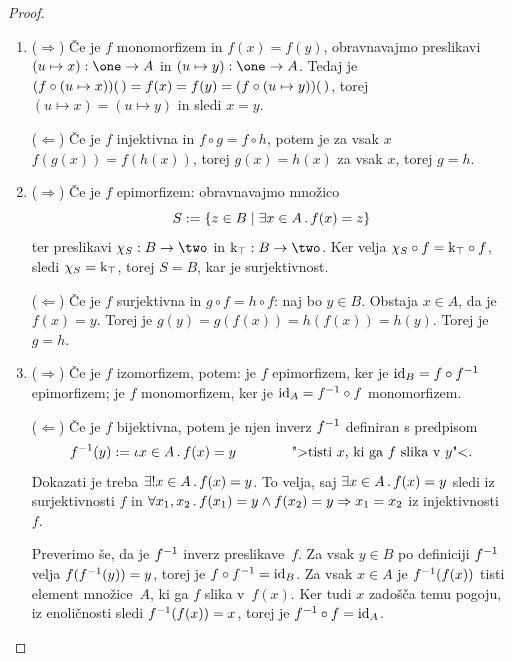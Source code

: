 \begin{proof}
  \begin{enumerate}
  \item ($\Rightarrow$) Če je $f$ monomorfizem in $f(x) = f(y)$, obravnavajmo preslikavi
  $(u \mapsto x) : \one \to A$ in $(u \mapsto y) : \one \to A$. Tedaj je
  $(f \circ (u \mapsto x)) \unit = f(x) = f(y) = (f \circ (u \mapsto y)) \unit$, torej
  $(u \mapsto x) = (u \mapsto y)$ in sledi $x = y$.

  ($\Leftarrow$) Če je $f$ injektivna in $f \circ g = f \circ h$, potem je za vsak $x$
  $f(g(x)) = f(h(x))$, torej $g(x) = h(x)$ za vsak $x$, torej $g = h$.

  \item
    ($\Rightarrow$) Če je $f$ epimorfizem: obravnavajmo množico
    \begin{equation*}
      S \defeq \set{ z \in B \such \some{x \in A} f(x) = z }
    \end{equation*}
    ter preslikavi $\chi_S : B \to \two$ in $\konst{\top} : B \to \two$. Ker velja
    $\chi_S \circ f = \konst{\top} \circ f$, sledi $\chi_S = \konst{\top}$, torej $S = B$, kar je surjektivnost.

    ($\Leftarrow$) Če je $f$ surjektivna in $g \circ f = h \circ f$: naj bo $y \in B$. Obstaja $x \in A$, da je $f(x) = y$. Torej je $g(y) = g(f(x)) = h(f(x)) = h(y)$.
    Torej je $g = h$.

  \item ($\Rightarrow$) Če je $f$ izomorfizem, potem:
    je $f$ epimorfizem, ker je $\id[B] = f \circ \inv{f}$ epimorfizem;
    je $f$ monomorfizem, ker je $\id[A] = \inv{f} \circ f$ monomorfizem.

    ($\Leftarrow$) Če je $f$ bijektivna, potem je njen inverz $\inv{f}$ definiran s predpisom
    \begin{equation*}
      \inv{f}(y) \defeq \descr{x \in A} f(x) = y \qquad\qquad
      \text{">tisti $x$, ki ga $f$ slika v $y$"<}.
    \end{equation*}
    Dokazati je treba $\exactlyone{x \in A} f(x) = y$.
    To velja, saj $\some{x \in A} f(x) = y$ sledi iz surjektivnosti $f$ in
    $\all{x_1, x_2} f(x_1) = y \land f(x_2) = y \lthen x_1 = x_2$ iz injektivnosti~$f$.

    Preverimo še, da je $\inv{f}$ inverz preslikave~$f$.
    Za vsak $y \in B$ po definiciji $\inv{f}$ velja $f(\inv{f}(y)) = y$, torej je $f \circ \inv{f} = \id[B]$.
    Za vsak $x \in A$ je $\inv{f}(f(x))$ tisti element množice~$A$, ki ga $f$ slika v~$f(x)$.
    Ker tudi $x$ zadošča temu pogoju, iz enoličnosti sledi $\inv{f}(f(x)) = x$, torej je $\inv{f} \circ f = \id[A]$.
  \end{enumerate}
\end{proof}

